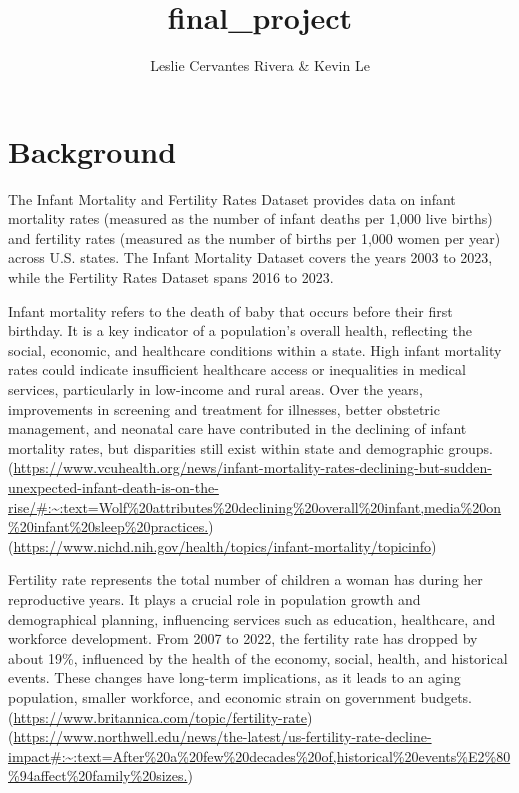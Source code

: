 \documentclass[
  letterpaper,
  DIV=11,
  numbers=noendperiod]{scrartcl}
\title{final\_project}
\author{Leslie Cervantes Rivera \& Kevin Le}
\date{}
\begin{document}
\maketitle


\section{Background}\label{background}

The Infant Mortality and Fertility Rates Dataset provides data on infant
mortality rates (measured as the number of infant deaths per 1,000 live
births) and fertility rates (measured as the number of births per 1,000
women per year) across U.S. states. The Infant Mortality Dataset covers
the years 2003 to 2023, while the Fertility Rates Dataset spans 2016 to
2023.

Infant mortality refers to the death of baby that occurs before their
first birthday. It is a key indicator of a population's overall health,
reflecting the social, economic, and healthcare conditions within a
state. High infant mortality rates could indicate insufficient
healthcare access or inequalities in medical services, particularly in
low-income and rural areas. Over the years, improvements in screening
and treatment for illnesses, better obstetric management, and neonatal
care have contributed in the declining of infant mortality rates, but
disparities still exist within state and demographic groups.
(\url{https://www.vcuhealth.org/news/infant-mortality-rates-declining-but-sudden-unexpected-infant-death-is-on-the-rise/\#:~:text=Wolf\%20attributes\%20declining\%20overall\%20infant,media\%20on\%20infant\%20sleep\%20practices.})
(\url{https://www.nichd.nih.gov/health/topics/infant-mortality/topicinfo})

Fertility rate represents the total number of children a woman has
during her reproductive years. It plays a crucial role in population
growth and demographical planning, influencing services such as
education, healthcare, and workforce development. From 2007 to 2022, the
fertility rate has dropped by about 19\%, influenced by the health of
the economy, social, health, and historical events. These changes have
long-term implications, as it leads to an aging population, smaller
workforce, and economic strain on government budgets.
(\url{https://www.britannica.com/topic/fertility-rate})
(\url{https://www.northwell.edu/news/the-latest/us-fertility-rate-decline-impact\#:~:text=After\%20a\%20few\%20decades\%20of,historical\%20events\%E2\%80\%94affect\%20family\%20sizes.})
\end{document}
